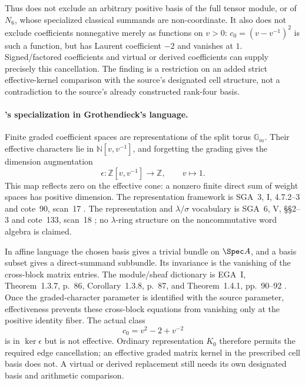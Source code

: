 Thus  does not exclude an arbitrary positive
basis of the full tensor module, or of \(N_6\), whose
specialized classical summands are non-coordinate.
It also does not exclude coefficients nonnegative merely
as functions on \(v>0\):
\(c_0=(v-v^{-1})^2\) is such a function, but has Laurent
coefficient \(-2\) and vanishes at \(1\).
Signed/factored coefficients and virtual or derived
coefficients can supply precisely this cancellation.
The finding is a restriction on an added strict
effective-kernel comparison with the source's designated
cell structure, not a contradiction to the source's
already constructed rank-four basis.

\paragraph{'s specialization in Grothendieck's language.}
Finite graded coefficient spaces are representations
of the split torus \(\mathbb G_m\).
Their effective characters lie in
\(\mathbb N[v,v^{-1}]\), and forgetting the grading gives
the dimension augmentation
\[
\epsilon:\mathbb Z[v,v^{-1}]\longrightarrow\mathbb Z,
\qquad v\longmapsto1.
\]
This map reflects zero on the effective cone:
a nonzero finite direct sum of weight spaces has positive
dimension.
The representation framework is SGA~3,
I, 4.7.2--3 and cote~90, scan~17
\cite{SGA3,Archive}.
The representation and \(\lambda/\sigma\) vocabulary is
SGA~6, V, \S\S2--3 and cote~133, scan~18
\cite{SGA6,Archive};
no \(\lambda\)-ring structure on the noncommutative
word algebra is claimed.

In affine language the chosen basis gives a trivial
bundle on \(\Spec A\), and a basis subset gives a
direct-summand subbundle.
Its invariance is the vanishing of the cross-block
matrix entries.
The module/sheaf dictionary is EGA~I,
Theorem~1.3.7, p.~86, Corollary~1.3.8, p.~87,
and Theorem~1.4.1, pp.~90--92 \cite{EGA}.
Once the graded-character parameter is identified
with the source parameter, effectiveness prevents
these cross-block equations from vanishing only at
the positive identity fiber.
The actual class
\[
c_0=v^2-2+v^{-2}
\]
is in \(\ker\epsilon\) but is not effective.
Ordinary representation \(K_0\) therefore permits
the required edge cancellation; an effective graded
matrix kernel in the prescribed cell basis does not.
A virtual or derived replacement still needs its
own designated basis and arithmetic comparison.

